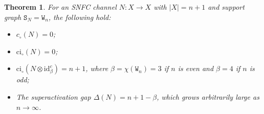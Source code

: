 \documentclass[12pt,a4paper]{article}
\newtheorem{theorem}{Theorem}
\begin{document}
\begin{theorem}\label{theo3}
For an SNFC channel $N : X \to X$ with $|X| = n + 1$ and support graph $\mathtt{S}_N = \mathtt{W}_n$, the following hold:
\begin{itemize}[itemsep=-0.15cm, parsep=0.15cm, topsep=2pt, leftmargin=0.8cm]
\item[\emph{(i)}] $c_\circ(N) = 0$;
\item[\emph{(ii)}] $\mathrm{ci}_\circ(N) = 0$;
\item[\emph{(iii)}] $\mathrm{ci}_\circ(N \otimes \mathrm{id}^c_\beta) = n + 1$, where $\beta = \chi(\mathtt{W}_n) =3$  if $n$ is even and $\beta = 4$  if $n$ is odd;
\item[\emph{(iv)}] The superactivation gap $\Delta(N)=n+1-\beta$, which grows arbitrarily large as $n \to \infty$.
\end{itemize}
\end{theorem}
\end{document}
